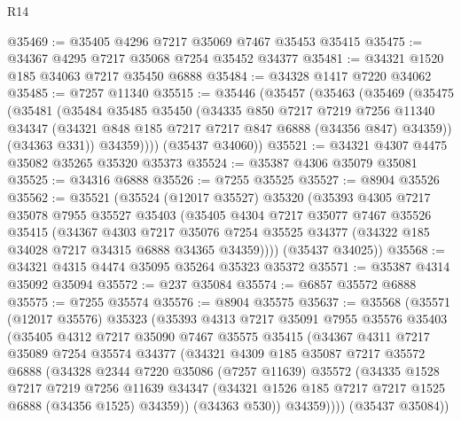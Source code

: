 \begin{lexlean}{R14}
\begin{coremodule}
@35469 := @35405 @4296 @7217 @35069 @7467 @35453 @35415
@35475 := @34367 @4295 @7217 @35068 @7254 @35452 @34377
@35481 := @34321 @1520 @185 @34063 @7217 @35450 @6888
@35484 := @34328 @1417 @7220 @34062
@35485 := @7257 @11340
@35515 := @35446
    (@35457
      (@35463
        (@35469
          (@35475
            (@35481
              (@35484
                @35485
                @35450
                (@34335
                  @850
                  @7217
                  @7219
                  @7256
                  @11340
                  @34347
                  (@34321 @848 @185 @7217 @7217 @847 @6888 (@34356 @847) @34359))
                (@34363 @331))
              @34359))))
      (@35437 @34060))
@35521 := @34321 @4307 @4475 @35082 @35265 @35320 @35373
@35524 := @35387 @4306 @35079 @35081
@35525 := @34316 @6888
@35526 := @7255 @35525
@35527 := @8904 @35526
@35562 := @35521
    (@35524
      (@12017 @35527)
      @35320
      (@35393
        @4305
        @7217
        @35078
        @7955
        @35527
        @35403
        (@35405
          @4304
          @7217
          @35077
          @7467
          @35526
          @35415
          (@34367
            @4303
            @7217
            @35076
            @7254
            @35525
            @34377
            (@34322 @185 @34028 @7217 @34315 @6888 @34365 @34359))))
      (@35437 @34025))
@35568 := @34321 @4315 @4474 @35095 @35264 @35323 @35372
@35571 := @35387 @4314 @35092 @35094
@35572 := @237 @35084
@35574 := @6857 @35572 @6888
@35575 := @7255 @35574
@35576 := @8904 @35575
@35637 := @35568
    (@35571
      (@12017 @35576)
      @35323
      (@35393
        @4313
        @7217
        @35091
        @7955
        @35576
        @35403
        (@35405
          @4312
          @7217
          @35090
          @7467
          @35575
          @35415
          (@34367
            @4311
            @7217
            @35089
            @7254
            @35574
            @34377
            (@34321
              @4309
              @185
              @35087
              @7217
              @35572
              @6888
              (@34328
                @2344
                @7220
                @35086
                (@7257 @11639)
                @35572
                (@34335
                  @1528
                  @7217
                  @7219
                  @7256
                  @11639
                  @34347
                  (@34321 @1526 @185 @7217 @7217 @1525 @6888 (@34356 @1525) @34359))
                (@34363 @530))
              @34359))))
      (@35437 @35084))

\end{coremodule}
\end{lexlean}
